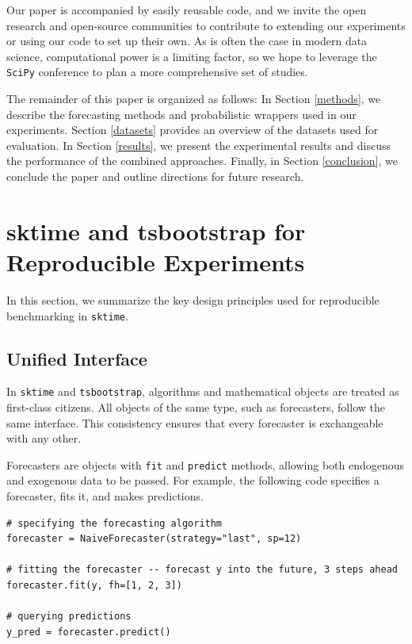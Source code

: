 Our paper is accompanied by easily reusable code, and we invite the open research and open-source communities to contribute to extending our experiments or using our code to set up their own. As is often the case in modern data science, computational power is a limiting factor, so we hope to leverage the \texttt{SciPy} conference to plan a more comprehensive set of studies.

The remainder of this paper is organized as follows: In Section \ref{methods}, we describe the forecasting methods and probabilistic wrappers used in our experiments. Section \ref{datasets} provides an overview of the datasets used for evaluation. In Section \ref{results}, we present the experimental results and discuss the performance of the combined approaches. Finally, in Section \ref{conclusion}, we conclude the paper and outline directions for future research.

\section{sktime and tsbootstrap for Reproducible Experiments}\label{sktime}

In this section, we summarize the key design principles used for reproducible benchmarking in \texttt{sktime}.

\subsection{Unified Interface}
In \texttt{sktime} and \texttt{tsbootstrap}, algorithms and mathematical objects are treated as first-class citizens. All objects of the same type, such as forecasters, follow the same interface. This consistency ensures that every forecaster is exchangeable with any other.

Forecasters are objects with \texttt{fit} and \texttt{predict} methods, allowing both endogenous and exogenous data to be passed. For example, the following code specifies a forecaster, fits it, and makes predictions.

\begin{verbatim}
# specifying the forecasting algorithm
forecaster = NaiveForecaster(strategy="last", sp=12)

# fitting the forecaster -- forecast y into the future, 3 steps ahead
forecaster.fit(y, fh=[1, 2, 3])

# querying predictions
y_pred = forecaster.predict()
\end{verbatim}

